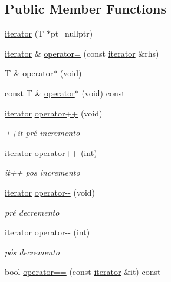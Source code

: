 \subsection*{Public Member Functions}
\begin{DoxyCompactItemize}
\item 
\hyperlink{classsc_1_1array_1_1iterator_a92c82b17f5fef34bb3530fa95887c5da}{iterator} (T $\ast$pt=nullptr)
\item 
\hyperlink{classsc_1_1array_1_1iterator}{iterator} \& \hyperlink{classsc_1_1array_1_1iterator_a764f122ad659642c353cf09df46fa88e}{operator=} (const \hyperlink{classsc_1_1array_1_1iterator}{iterator} \&rhs)
\item 
T \& \hyperlink{classsc_1_1array_1_1iterator_abadbb040e3ec615b4c08bcb2a6427272}{operator$\ast$} (void)
\item 
const T \& \hyperlink{classsc_1_1array_1_1iterator_a97cc19147471cd7b7b72174a3fe55159}{operator$\ast$} (void) const
\item 
\hyperlink{classsc_1_1array_1_1iterator}{iterator} \hyperlink{classsc_1_1array_1_1iterator_a034796f5c6189abd3ee74384a5a37488}{operator++} (void)
\begin{DoxyCompactList}\small\item\em ++it pré incremento \end{DoxyCompactList}\item 
\hyperlink{classsc_1_1array_1_1iterator}{iterator} \hyperlink{classsc_1_1array_1_1iterator_a083298121c2b04aadd273763fb9db65f}{operator++} (int)
\begin{DoxyCompactList}\small\item\em it++ pos incremento \end{DoxyCompactList}\item 
\hyperlink{classsc_1_1array_1_1iterator}{iterator} \hyperlink{classsc_1_1array_1_1iterator_a75ad3e03c3fa61baef586f5f2486ecd8}{operator-\/-\/} (void)
\begin{DoxyCompactList}\small\item\em pré decremento \end{DoxyCompactList}\item 
\hyperlink{classsc_1_1array_1_1iterator}{iterator} \hyperlink{classsc_1_1array_1_1iterator_aaa661b8d468c66579c923ced7e3dded1}{operator-\/-\/} (int)
\begin{DoxyCompactList}\small\item\em pós decremento \end{DoxyCompactList}\item 
bool \hyperlink{classsc_1_1array_1_1iterator_a7bd7f976868a154eb215f0c961444097}{operator==} (const \hyperlink{classsc_1_1array_1_1iterator}{iterator} \&it) const

\end{DoxyCompactItemize}
